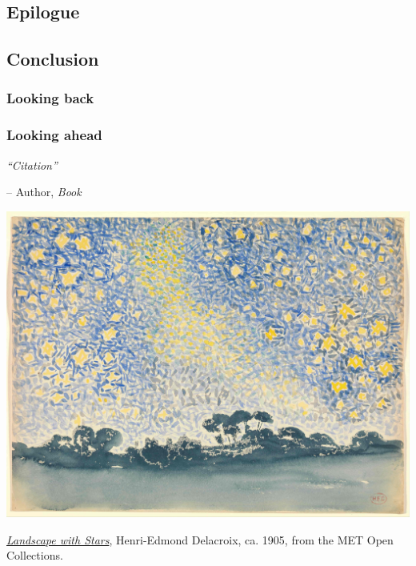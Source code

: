 \begin{fullwidth}
\part[EPILOGUE]{Epilogue}

\chapter[CONCLUSION]{Conclusion}
\label{chap:conclusion}
\end{fullwidth}



\section{Looking back}
\label{sec:conclusion:back}

\blindtext


\section{Looking ahead}
\label{sec:conclusion:ahead}
\blindtext


\begin{plate*}[p]
    \centering
    
    \textit{“Citation”}
    
    -- Author, \textit{Book}
    
    \vspace{3em}
    
    \includegraphics[width=\textwidth]{00-met-artwork/delacroix_stars.jpg}
    \caption[Landscape with Stars, Henri-Edmond Delacroix]{\href{https://www.metmuseum.org/art/collection/search/459189}{\textit{Landscape with Stars}}, Henri-Edmond Delacroix, ca. 1905, from the  MET Open Collections.}

\end{plate*}